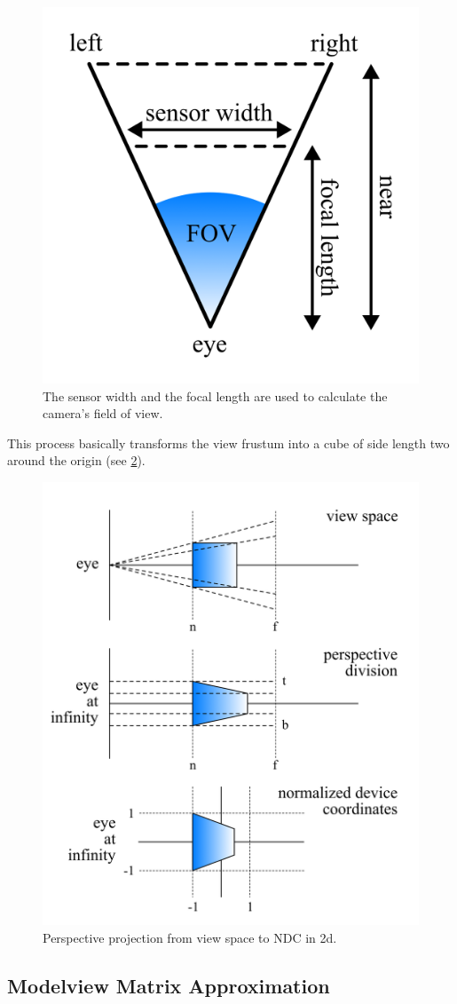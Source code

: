 \documentclass[conference]{IEEEtran}
\begin{document}
\begin{figure}[H]
    \centering
    \includegraphics[width=0.4\columnwidth]{./images/focal_lenght_and_field_of_view.png}
    \caption{The sensor width and the focal length are used to calculate the camera's field of view.}
    \label{img:fov}
\end{figure}

This process basically transforms the view frustum into a cube of side length two around the origin (see \ref{img:view_to_ndc}).

\begin{figure}[H]
    \centering
    \includegraphics[width=0.8\columnwidth]{./images/view_coordinates_to_ndc.png}
    \caption{Perspective projection from view space to NDC in 2d.}
    \label{img:view_to_ndc}
\end{figure}


\subsection{Modelview Matrix Approximation}
\end{document}
